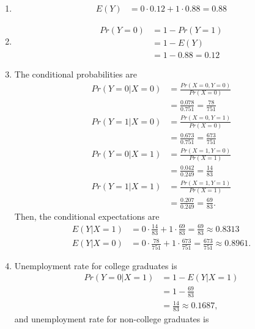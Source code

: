 \documentclass[
]{book}
\begin{document}
\begin{enumerate}
\def\labelenumi{\alph{enumi}.}
\item
  \begin{align}
        E(Y)
        & = 0\cdot 0.12 + 1\cdot 0.88 
          = 0.88
    \end{align}
\item
  \begin{align}
        Pr(Y = 0) 
        & = 1 - Pr(Y = 1) \\
        & = 1 - E(Y) \\
        & = 1 - 0.88
          = 0.12
    \end{align}
\item
  The conditional probabilities are
  \begin{align}
        Pr(Y = 0 \lvert X = 0)
        & = \frac{Pr(X=0,Y=0)}{Pr(X=0)} \\
        & = \frac{0.078}{0.751} 
          = \frac{78}{751} \\
        Pr(Y = 1 \lvert X = 0)
        & = \frac{Pr(X=0,Y=1)}{Pr(X=0)} \\
        & = \frac{0.673}{0.751} 
          = \frac{673}{751} \\
        Pr(Y = 0 \lvert X = 1)
        & = \frac{Pr(X=1,Y=0)}{Pr(X=1)} \\
        & = \frac{0.042}{0.249} 
          = \frac{14}{83} \\
        Pr(Y = 1 \lvert X = 1)
        & = \frac{Pr(X=1,Y=1)}{Pr(X=1)} \\
        & = \frac{0.207}{0.249} 
          = \frac{69}{83}.   
    \end{align}
  Then, the conditional expectations are
  \begin{align}
        E(Y \lvert X = 1)
        & = 0\cdot \frac{14}{83} + 1\cdot \frac{69}{83}
          = \frac{69}{83} 
          \approx 0.8313 \\
        E(Y \lvert X = 0)
        & = 0\cdot \frac{78}{751} + 1\cdot \frac{673}{751}
          = \frac{673}{751} 
          \approx 0.8961.
    \end{align}
\item
  Unemployment rate for college graduates is
  \begin{align}
        Pr(Y = 0 \lvert X = 1)
        & = 1 - E(Y \lvert X = 1) \\
        & = 1 - \frac{69}{83} \\
        & = \frac{14}{83}
          \approx 0.1687,
    \end{align}
  and unemployment rate for non-college graduates is

\end{enumerate}
\end{document}
